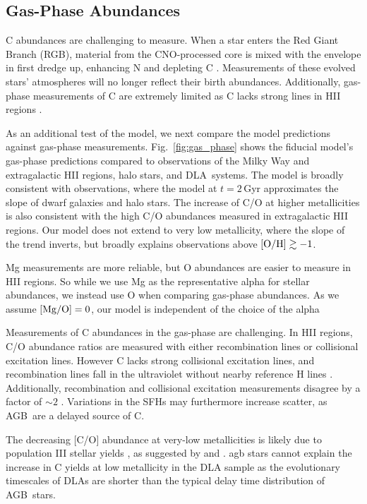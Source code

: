\documentclass[fleqn,usenatbib]{mnras}
\newcommand{\agb}{AGB}
\newcommand{\sfh}{SFH}
\newcommand{\dla}{DLA}
\newcommand{\about}[1]{${\sim} #1$}
\begin{document}
\subsection{Gas-Phase Abundances}\label{sec:gas}

C abundances are challenging to measure. When a star enters the Red Giant Branch (RGB), material from the CNO-processed core is mixed with the envelope in first dredge up, enhancing N and depleting C \citep{iben67, vincenzo+21,KL14}. Measurements of these evolved stars'  atmospheres will no longer reflect their birth abundances.  Additionally, gas-phase measurements of C are extremely limited as C lacks strong lines in HII regions \citep{skillman+20}.

As an additional test of the model, we next compare the model predictions against gas-phase measurements. Fig.~\ref{fig:gas_phase} shows the fiducial model's gas-phase predictions compared to observations of the Milky Way and extragalactic HII regions, halo stars, and \dla\ systems. The model is broadly consistent with observations, where the model at $t=2$\,Gyr approximates the slope of dwarf galaxies and halo stars. The increase of C/O at higher metallicities is also consistent with the high C/O abundances measured in extragalactic HII regions. 
Our model does not extend to very low metallicity, where the slope of the trend inverts, but broadly explains observations above $\rm [O/H] \gtrsim -1$. 

Mg measurements are more reliable, but O abundances are easier to measure in HII regions. So while we use Mg as the representative alpha for stellar abundances, we instead use O when comparing gas-phase abundances. As we assume ${\rm[Mg/O]}=0$, our model is independent of the choice of the alpha

Measurements of C abundances in the gas-phase are challenging. In HII regions, C/O abundance ratios are measured with either recombination lines or collisional excitation lines. However C lacks strong collisional excitation lines, and recombination lines fall in the ultraviolet without nearby reference H lines \citep{skillman+20}. Additionally, recombination and collisional excitation measurements disagree by a factor of \about{2} \citep{GR07}.
Variations in the \sfh{}s may furthermore increase scatter, as \agb\ are a delayed source of C.

The decreasing [C/O] abundance at very-low metallicities is likely due to population III stellar yields \citep[e.g.][]{hirschi07}, as suggested by \citet{cooke+17} and \citet{FN15}. agb stars cannot explain the increase in C yields at low metallicity in the \dla{} sample as the evolutionary timescales of \dla{}s are shorter than the typical delay time distribution of \agb\ stars.
\end{document}
